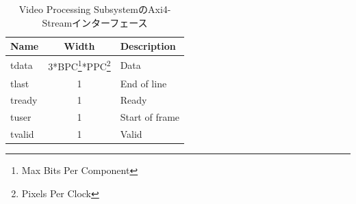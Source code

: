 \begin{table}[htbp]
  \caption{Video Processing SubsystemのAxi4-Streamインターフェース}
  \label{tb:fpga-axi4-stream}
  \begin{center}
  \begin{tabular}{l|c|l}
    \hline
    Name   & Width     & Description \\\hline\hline
    tdata  & 3*BPC\footnote{Max Bits Per Component}*PPC\footnote{Pixels Per Clock} & Data \\\hline
    tlast  & 1         & End of line \\\hline
    tready & 1         & Ready \\\hline
    tuser  & 1         & Start of frame \\\hline
    tvalid & 1         & Valid \\\hline
  \end{tabular}\end{center}
\end{table}








